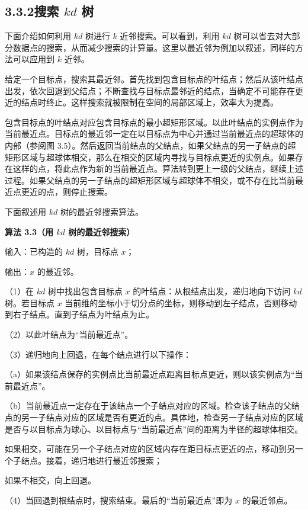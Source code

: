 \documentclass[UTF8,12pt,a4paper,fontset=fandol]{ctexart}
\begin{document}
\subsection*{3.3.2\quad 搜索 $kd$ 树}

下面介绍如何利用 $kd$ 树进行 $k$ 近邻搜索。可以看到，利用 $kd$ 树可以省去对大部分数据点的搜索，从而减少搜索的计算量。这里以最近邻为例加以叙述，同样的方法可以应用到 $k$ 近邻。

给定一个目标点，搜索其最近邻。首先找到包含目标点的叶结点；然后从该叶结点出发，依次回退到父结点；不断查找与目标点最邻近的结点，当确定不可能存在更近的结点时终止。这样搜索就被限制在空间的局部区域上，效率大为提高。

包含目标点的叶结点对应包含目标点的最小超矩形区域。以此叶结点的实例点作为当前最近点。目标点的最近邻一定在以目标点为中心并通过当前最近点的超球体的内部（参阅图 3.5）。然后返回当前结点的父结点，如果父结点的另一子结点的超矩形区域与超球体相交，那么在相交的区域内寻找与目标点更近的实例点。如果存在这样的点，将此点作为新的当前最近点。算法转到更上一级的父结点，继续上述过程。如果父结点的另一子结点的超矩形区域与超球体不相交，或不存在比当前最近点更近的点，则停止搜索。

下面叙述用 $kd$ 树的最近邻搜索算法。

\noindent\textbf{算法 3.3（用 $kd$ 树的最近邻搜索）}

\noindent 输入：已构造的 $kd$ 树，目标点 $x$；

\noindent 输出：$x$ 的最近邻。

（1）在 $kd$ 树中找出包含目标点 $x$ 的叶结点：从根结点出发，递归地向下访问 $kd$ 树。若目标点 $x$ 当前维的坐标小于切分点的坐标，则移动到左子结点，否则移动到右子结点。直到子结点为叶结点为止。

（2）以此叶结点为“当前最近点”。

（3）递归地向上回退，在每个结点进行以下操作：

（a）如果该结点保存的实例点比当前最近点距离目标点更近，则以该实例点为“当前最近点”。

（b）当前最近点一定存在于该结点一个子结点对应的区域。检查该子结点的父结点的另一子结点对应的区域是否有更近的点。具体地，检查另一子结点对应的区域是否与以目标点为球心、以目标点与“当前最近点”间的距离为半径的超球体相交。

如果相交，可能在另一个子结点对应的区域内存在距目标点更近的点，移动到另一个子结点。接着，递归地进行最近邻搜索；

如果不相交，向上回退。

（4）当回退到根结点时，搜索结束。最后的“当前最近点”即为 $x$ 的最近邻点。
\end{document}
